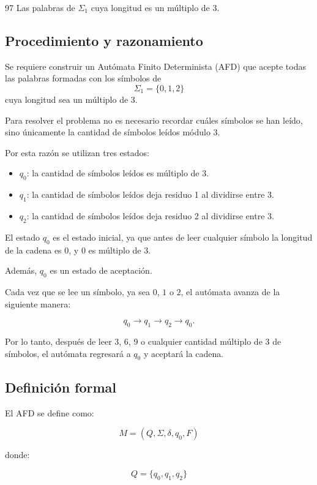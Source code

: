 \documentclass[12pt]{article}
\begin{document}
\begin{enunciado}{97}
Las palabras de $\Sigma_1$ cuya longitud es un múltiplo de 3.
\end{enunciado}

\subsection*{Procedimiento y razonamiento}

Se requiere construir un Autómata Finito Determinista (AFD) que acepte
todas las palabras formadas con los símbolos de
\[
\Sigma_1=\{0,1,2\}
\]
cuya longitud sea un múltiplo de 3.

Para resolver el problema no es necesario recordar cuáles símbolos se han
leído, sino únicamente la cantidad de símbolos leídos módulo 3.

Por esta razón se utilizan tres estados:

\begin{itemize}
    \item $q_0$: la cantidad de símbolos leídos es múltiplo de 3.
    \item $q_1$: la cantidad de símbolos leídos deja residuo 1 al dividirse entre 3.
    \item $q_2$: la cantidad de símbolos leídos deja residuo 2 al dividirse entre 3.
\end{itemize}

El estado $q_0$ es el estado inicial, ya que antes de leer cualquier
símbolo la longitud de la cadena es 0, y 0 es múltiplo de 3.

Además, $q_0$ es un estado de aceptación.

Cada vez que se lee un símbolo, ya sea $0$, $1$ o $2$, el autómata
avanza de la siguiente manera:

\[
q_0 \longrightarrow q_1 \longrightarrow q_2 \longrightarrow q_0.
\]

Por lo tanto, después de leer 3, 6, 9 o cualquier cantidad múltiplo
de 3 de símbolos, el autómata regresará a $q_0$ y aceptará la cadena.


\subsection*{Definición formal}

El AFD se define como:

\[
M=(Q,\Sigma,\delta,q_0,F)
\]

donde:

\[
Q=\{q_0,q_1,q_2\}
\]
\end{document}
